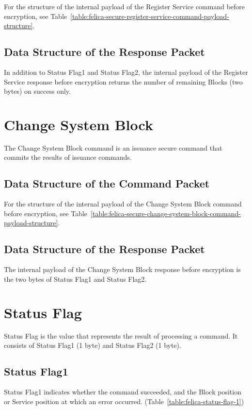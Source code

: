 \documentclass[a4paper,11pt]{report}
\begin{document}
For the structure of the internal payload of the Register Service command before encryption, see Table~\ref{table:felica-secure-register-service-command-payload-structure}.

\subsection{Data Structure of the Response Packet}

In addition to Status Flag1 and Status Flag2, the internal payload of the Register Service response before encryption returns the number of remaining Blocks (two bytes) on success only.

\section{Change System Block}

The Change System Block command is an issuance secure command that commits the results of issuance commands.

\subsection{Data Structure of the Command Packet}

For the structure of the internal payload of the Change System Block command before encryption, see Table~\ref{table:felica-secure-change-system-block-command-payload-structure}.

\subsection{Data Structure of the Response Packet}

The internal payload of the Change System Block response before encryption is the two bytes of Status Flag1 and Status Flag2.

\section{Status Flag}

Status Flag is the value that represents the result of processing a command. It consists of Status Flag1 (1 byte) and Status Flag2 (1 byte).

\subsection{Status Flag1}

Status Flag1 indicates whether the command succeeded, and the Block position or Service position at which an error occurred. (Table~\ref{table:felica-status-flag-1})
\end{document}
